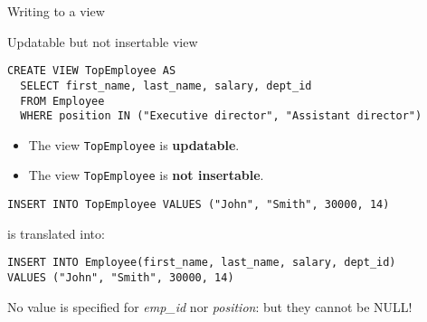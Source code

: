 \documentclass[xcolor=table]{beamer}
\begin{document}
\begin{frame}[fragile]{Writing to a view}

\begin{block}{Updatable but not insertable view}
    \footnotesize
\begin{verbatim}
CREATE VIEW TopEmployee AS
  SELECT first_name, last_name, salary, dept_id
  FROM Employee
  WHERE position IN ("Executive director", "Assistant director")
\end{verbatim}
\end{block}
\vfill
\begin{itemize}
  \item The view \texttt{TopEmployee} is {\bf updatable}.
  \item The view \texttt{TopEmployee} is {\bf not insertable}.
\end{itemize}
\vfill
\begin{exampleblock}{}
  \footnotesize{
\begin{verbatim}
INSERT INTO TopEmployee VALUES ("John", "Smith", 30000, 14)
\end{verbatim}
  }
is translated into:
\footnotesize{
\begin{verbatim}
INSERT INTO Employee(first_name, last_name, salary, dept_id) 
VALUES ("John", "Smith", 30000, 14)
\end{verbatim}
}
No value is specified for {\em emp\_id} nor {\em position}: but they cannot be NULL!
\end{exampleblock}
\vfill

\end{frame}
\end{document}
